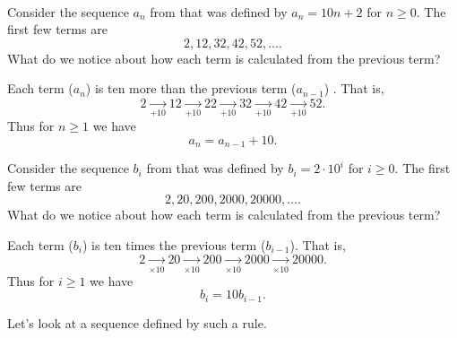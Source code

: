 \begin{exam}
\label{exam_first_look_rec_seq} 
~
    \begin{apart}
        \item Consider the sequence $a_n$ from  that was defined by $a_n=10n+2$ for $n\ge 0$.  The first few terms are $$2, 12, 32, 42, 52, \ldots.$$ What do we notice about how each term is calculated from the previous term?
            \begin{soln}
                Each term ($a_n$) is ten more than the previous term ($a_{n-1}$) .  That is,          
                    $$2 \xrightarrow[+ 10]{} 12 \xrightarrow[+ 10]{} 22 \xrightarrow[+ 10]{} 32 \xrightarrow[+ 10]{} 42 \xrightarrow[+ 10]{} 52.$$
                Thus for $n\ge 1$ we have $$a_n=a_{n-1}+10.$$
            \end{soln}
        \item Consider the sequence $b_i$ from  that was defined by $b_i=2\cdot10^i$ for $i\ge 0$. The first few terms are $$2, 20,200,2000,20000, \ldots.$$ What do we notice about how each term is calculated from the previous term?
            \begin{soln}
                Each term ($b_i$) is ten times the previous term ($b_{i-1}$).  That is,         
                    $$2 \xrightarrow[\times 10]{} 20 \xrightarrow[\times 10]{} 200 \xrightarrow[\times 10]{} 2000 \xrightarrow[\times 10]{} 20000.$$
                Thus for $i\ge 1$ we have $$b_i=10b_{i-1}.$$
            \end{soln} 
    \end{apart}
\end{exam} 

Let's look at a sequence defined by such a rule.

